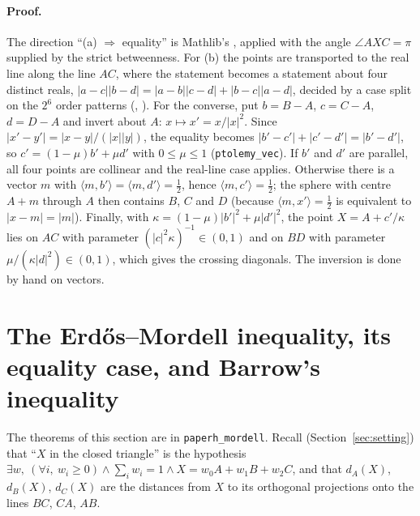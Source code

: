 \documentclass[11pt]{article}
\theoremstyle{definition}
\theoremstyle{remark}
\newcommand{\lean}[1]{\texttt{#1}}
\begin{document}
\paragraph{Proof.} The direction ``(a) $\Rightarrow$ equality'' is Mathlib's
, applied with the angle
$\angle AXC=\pi$ supplied by the strict betweenness. For (b) the points are transported to the real
line along the line $AC$, where the statement becomes a statement about four distinct reals,
$|a-c||b-d|=|a-b||c-d|+|b-c||a-d|$, decided by a case split on the $2^6$ order patterns
(, ). For the converse,
put $b=B-A$, $c=C-A$, $d=D-A$ and invert about $A$: $x\mapsto x'=x/|x|^2$. Since
$|x'-y'|=|x-y|/(|x||y|)$, the equality becomes $|b'-c'|+|c'-d'|=|b'-d'|$, so $c'=(1-\mu)b'+\mu d'$
with $0\le\mu\le1$ (\lean{ptolemy\_vec}). If $b'$ and $d'$ are parallel, all four points are
collinear and the real-line case applies. Otherwise there is a vector $m$ with
$\langle m,b'\rangle=\langle m,d'\rangle=\tfrac12$, hence $\langle m,c'\rangle=\tfrac12$; the sphere
with centre $A+m$ through $A$ then contains $B$, $C$ and $D$ (because $\langle m,x'\rangle=\tfrac12$
is equivalent to $|x-m|=|m|$). Finally, with $\kappa=(1-\mu)|b'|^2+\mu|d'|^2$, the point
$X=A+c'/\kappa$ lies on $AC$ with parameter $(|c|^2\kappa)^{-1}\in(0,1)$ and on $BD$ with parameter
$\mu/(\kappa|d|^2)\in(0,1)$, which gives the crossing diagonals. The inversion is done by hand on vectors.
\section{The Erdős--Mordell inequality, its equality case, and Barrow's inequality}\label{sec:mordell}
The theorems of this section are in \lean{paperh\_mordell}. Recall (Section~\ref{sec:setting}) that
``$X$ in the closed triangle'' is the hypothesis $\exists w,\ (\forall i,\ w_i\ge0)\wedge\sum_iw_i=1
\wedge X=w_0A+w_1B+w_2C$, and that $d_A(X)$, $d_B(X)$, $d_C(X)$ are the distances from $X$ to its
orthogonal projections onto the lines $BC$, $CA$, $AB$.
\end{document}
